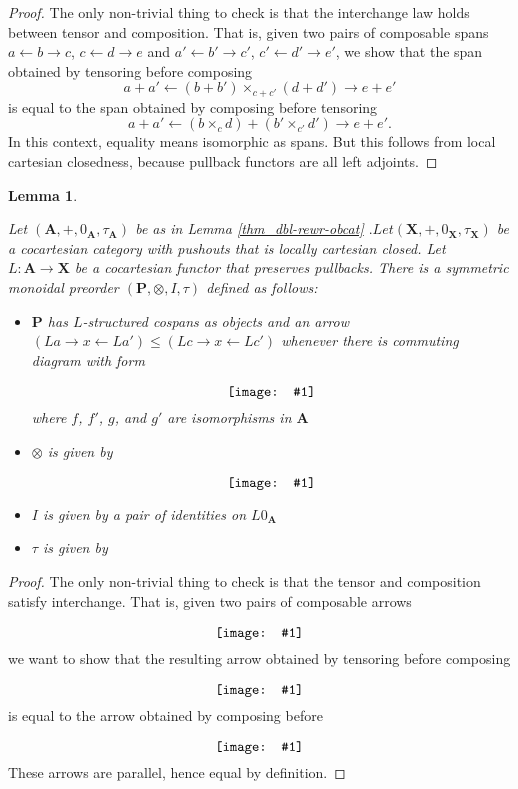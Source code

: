\documentclass[]{amsart}
\newcommand{\A}{\cat{A}}
\renewcommand{\P}{\cat{P}}
\newcommand{\X}{\cat{X}}
\newcommand{\cat}[1]{\mathbf{#1}}
\newcommand{\from}{\colon}
\newcommand{\diagram}[1]{\raisebox{-0.5\height}{\texttt{[image: \#1]}}}
\newtheorem{lemma}[theorem]{Lemma}
\theoremstyle{remark}
\theoremstyle{definition}
\begin{document}
\begin{proof}
  
  The only non-trivial thing to check is that the interchange law
  holds between tensor and composition.  That is, given two pairs of
  composable spans $ a \gets b \to c $, $ c \gets d \to e $ and
  $ a' \gets b' \to c' $, $ c' \gets d' \to e' $, we show that the
  span obtained by tensoring before composing
  \[
    a + a' \gets (b + b') \times_{c + c'} (d + d') \to e + e'
  \]
  is equal to the span obtained by composing before tensoring
  \[
    a + a' \gets (b \times_{c} d) + (b' \times_{c'} d') \to e + e'.
  \]
  In this context, equality means isomorphic as spans. But this
  follows from local cartesian closedness, because pullback functors
  are all left adjoints.
  
\end{proof}

\begin{lemma} \label{thm:dlb-rewr-arrcat}
  
  Let $ (\A , + , 0_\A , \tau_\A ) $ be as in Lemma
  \ref{thm_dbl-rewr-obcat} $. Let (\X , + , 0_\X , \tau_\X ) $ be a
  cocartesian category with pushouts that is locally cartesian
  closed. Let $ L \from \A \to \X $ be a cocartesian functor that
  preserves pullbacks. There is a symmetric monoidal preorder
  $ (\P , \otimes , I , \tau ) $ defined as follows:
  
  \begin{itemize}
  \item $ \P $ has $ L $-structured cospans as objects and an arrow
    $ (L a \to x \gets L a') \leq (L c \to x \gets L c') $ whenever
    there is commuting diagram with form
      \[
        \diagram{diag_nlr_dbl-rewrite-2cell}
      \]
      where $ f $, $ f' $, $ g $, and $ g' $ are isomorphisms in $ \A $
    \item $ \otimes $ is given by
       \[
         \diagram{diag_nlr_dbl-rewrite-tensor}
       \]
    \item $ I $ is given by a pair of identities on $ L0_{\A} $
    \item $ \tau $ is given by
      \begin{center}
	\diagram{diag_nlr_dbl-rewrite-braiding}
      \end{center}
    \end{itemize}
    
\end{lemma}
\begin{proof}
  
  The only non-trivial thing to check is that the tensor and
  composition satisfy interchange. That is, given two pairs of
  composable arrows
  \[
    \diagram{diag_nlr_preorder-interchange}
  \]
  we want to show that the resulting arrow obtained by tensoring before composing
  \[
    \diagram{diag_nlr_preorder-tensor-compose}
  \]
  is equal to the arrow obtained by composing before
  \[
    \diagram{diag_nlr_preorder-compose-tensor}
  \]
  These arrows are parallel, hence equal by definition.
  
\end{proof}
\end{document}
